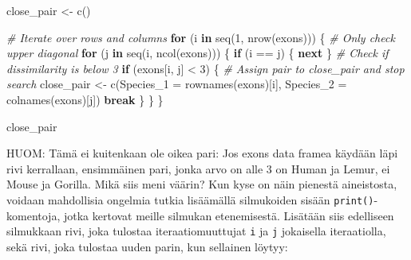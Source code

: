 \documentclass[
]{book}
\newenvironment{Shaded}{\begin{snugshade}}{\end{snugshade}}
\newcommand{\AttributeTok}[1]{\textcolor[rgb]{0.77,0.63,0.00}{#1}}
\newcommand{\CommentTok}[1]{\textcolor[rgb]{0.56,0.35,0.01}{\textit{#1}}}
\newcommand{\ControlFlowTok}[1]{\textcolor[rgb]{0.13,0.29,0.53}{\textbf{#1}}}
\newcommand{\DecValTok}[1]{\textcolor[rgb]{0.00,0.00,0.81}{#1}}
\newcommand{\FunctionTok}[1]{\textcolor[rgb]{0.00,0.00,0.00}{#1}}
\newcommand{\NormalTok}[1]{#1}
\newcommand{\OtherTok}[1]{\textcolor[rgb]{0.56,0.35,0.01}{#1}}
\newcommand{\SpecialCharTok}[1]{\textcolor[rgb]{0.00,0.00,0.00}{#1}}
\begin{document}
\begin{Shaded}
\begin{Highlighting}[]
\NormalTok{close\_pair }\OtherTok{\textless{}{-}} \FunctionTok{c}\NormalTok{()}

\CommentTok{\# Iterate over rows and columns}
\ControlFlowTok{for}\NormalTok{ (i }\ControlFlowTok{in} \FunctionTok{seq}\NormalTok{(}\DecValTok{1}\NormalTok{, }\FunctionTok{nrow}\NormalTok{(exons))) \{}
  \CommentTok{\# Only check upper diagonal}
  \ControlFlowTok{for}\NormalTok{ (j }\ControlFlowTok{in} \FunctionTok{seq}\NormalTok{(i, }\FunctionTok{ncol}\NormalTok{(exons))) \{}
    \ControlFlowTok{if}\NormalTok{ (i }\SpecialCharTok{==}\NormalTok{ j) \{}
       \ControlFlowTok{next}
\NormalTok{    \}}
    \CommentTok{\# Check if dissimilarity is below 3}
    \ControlFlowTok{if}\NormalTok{ (exons[i, j] }\SpecialCharTok{\textless{}} \DecValTok{3}\NormalTok{) \{}
      \CommentTok{\# Assign pair to close\_pair and stop search}
\NormalTok{      close\_pair }\OtherTok{\textless{}{-}} \FunctionTok{c}\NormalTok{(}\AttributeTok{Species\_1 =} \FunctionTok{rownames}\NormalTok{(exons)[i],}
                      \AttributeTok{Species\_2 =} \FunctionTok{colnames}\NormalTok{(exons)[j])}
      \ControlFlowTok{break}
\NormalTok{    \}}
\NormalTok{  \}}
\NormalTok{\}}

\NormalTok{close\_pair}
\end{Highlighting}
\end{Shaded}

HUOM: Tämä ei kuitenkaan ole oikea pari: Jos exons data framea käydään läpi rivi kerrallaan, ensimmäinen pari, jonka arvo on alle 3 on Human ja Lemur, ei Mouse ja Gorilla. Mikä siis meni väärin? Kun kyse on näin pienestä aineistosta, voidaan mahdollisia ongelmia tutkia lisäämällä silmukoiden sisään \texttt{print()}-komentoja, jotka kertovat meille silmukan etenemisestä. Lisätään siis edelliseen silmukkaan rivi, joka tulostaa iteraatiomuuttujat \texttt{i} ja \texttt{j} jokaisella iteraatiolla, sekä rivi, joka tulostaa uuden parin, kun sellainen löytyy:
\end{document}
